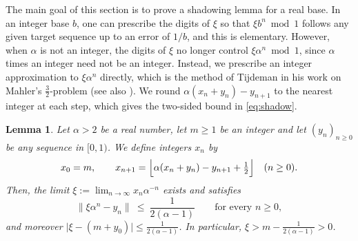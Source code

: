 \documentclass[11pt,reqno]{amsart}
\newtheorem{lemma}[theorem]{Lemma}
\theoremstyle{definition}
\theoremstyle{remark}
\numberwithin{equation}{section}
\begin{document}
The main goal of this section is to prove a shadowing lemma for a real base. In an integer base $b$, one can prescribe the digits of $\xi$ so that $\xi b^n\bmod1$ follows any given target sequence up to an error of $1/b$, and this is elementary. However, when $\alpha$ is not an integer, the digits of $\xi$ no longer control $\xi\alpha^n\bmod1$, since $\alpha$ times an integer need not be an integer. Instead, we prescribe an integer approximation to $\xi\alpha^n$ directly, which is the method of Tijdeman in his work on Mahler's $\tfrac32$-problem \cite{Ti} (see also \cite[Theorem~2.14]{Bu}). We round $\alpha(x_n+y_n)-y_{n+1}$ to the nearest integer at each step, which gives the two-sided bound in \eqref{eq:shadow}.

\begin{lemma}\label{lem:shadow}
Let $\alpha>2$ be a real number, let $m\ge1$ be an integer and let $(y_n)_{n\ge0}$ be any sequence in $[0,1)$. We define integers $x_n$ by
\[
x_0=m,\qquad x_{n+1}=\Bigl\lfloor\alpha(x_n+y_n)-y_{n+1}+\tfrac12\Bigr\rfloor\quad(n\ge0).
\]
Then, the limit $\xi:=\lim_{n\to\infty}x_n\alpha^{-n}$ exists and satisfies
\begin{equation}\label{eq:shadow}
\bigl\|\xi\alpha^n-y_n\bigr\|\ \le\ \frac1{2(\alpha-1)}\qquad\text{for every }n\ge0,
\end{equation}
and moreover $\bigl|\xi-(m+y_0)\bigr|\le\tfrac1{2(\alpha-1)}$. In particular, $\xi>m-\tfrac1{2(\alpha-1)}>0$.
\end{lemma}
\end{document}
